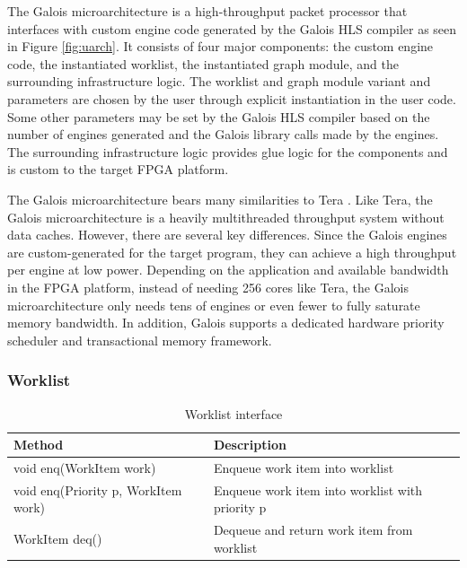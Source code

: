 The Galois microarchitecture is a high-throughput packet processor that interfaces with custom engine code generated 
by the Galois HLS compiler as seen in Figure \ref{fig:uarch}. It consists of four major components: the custom engine code, the 
instantiated worklist, the instantiated graph module, and the surrounding infrastructure logic. The worklist and graph 
module variant and parameters are chosen by the user through explicit instantiation in the user code. Some other 
parameters may be set by the Galois HLS compiler based on the number of engines generated and the Galois library calls 
made by the engines. The surrounding infrastructure logic provides glue logic for the components and is custom to the 
target FPGA platform.

The Galois microarchitecture bears many similarities to Tera \cite{tera}. Like Tera, the Galois microarchitecture is 
a heavily multithreaded throughput system without data caches. However, there are several key differences. Since the 
Galois engines are custom-generated for the target program, they can achieve a high throughput per engine at low power. 
Depending on the application and available bandwidth in the FPGA platform, instead of 
needing 256 cores like Tera, the Galois microarchitecture only needs tens of engines or even fewer to fully saturate 
memory bandwidth. In addition, Galois supports a dedicated hardware priority scheduler and transactional memory 
framework.

\subsubsection{Worklist}

\begin{table}
\begin{tabular}{ | l | l | }
  \hline
  \textbf{Method} & \textbf{Description} \\
  \hline
  void enq(WorkItem work) & Enqueue work item into worklist \\
  \hline
  void enq(Priority p, WorkItem work) & Enqueue work item into worklist with priority p\\
  \hline
  WorkItem deq() & Dequeue and return work item from worklist \\
  \hline
\end{tabular}
\caption{Worklist interface}
\label{table:worklist}
\end{table}

